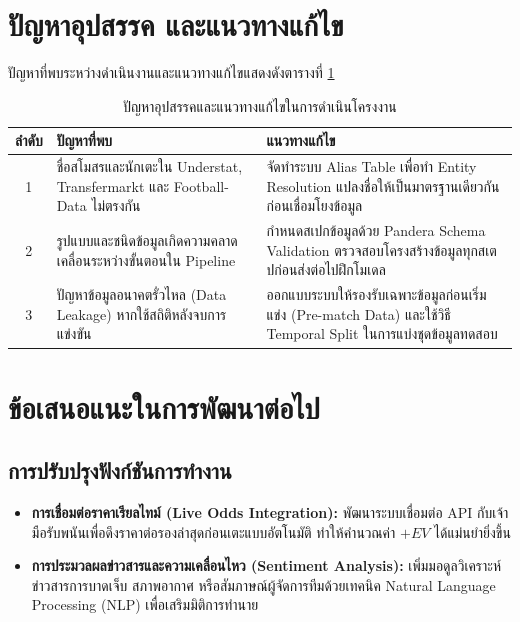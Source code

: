 \section{ปัญหาอุปสรรค และแนวทางแก้ไข}

ปัญหาที่พบระหว่างดำเนินงานและแนวทางแก้ไขแสดงดังตารางที่ \ref{tab:problems}

\begin{table}[htbp]
\centering
\caption{ปัญหาอุปสรรคและแนวทางแก้ไขในการดำเนินโครงงาน}
\label{tab:problems}
\begin{tabular}{|c|p{5cm}|p{6.5cm}|}
\hline
\textbf{ลำดับ} & \textbf{ปัญหาที่พบ} & \textbf{แนวทางแก้ไข} \\
\hline
1 & ชื่อสโมสรและนักเตะใน Understat, Transfermarkt และ Football-Data ไม่ตรงกัน & จัดทำระบบ Alias Table เพื่อทำ Entity Resolution แปลงชื่อให้เป็นมาตรฐานเดียวกันก่อนเชื่อมโยงข้อมูล \\ \hline
2 & รูปแบบและชนิดข้อมูลเกิดความคลาดเคลื่อนระหว่างขั้นตอนใน Pipeline & กำหนดสเปกข้อมูลด้วย Pandera Schema Validation ตรวจสอบโครงสร้างข้อมูลทุกสเตปก่อนส่งต่อไปฝึกโมเดล \\ \hline
3 & ปัญหาข้อมูลอนาคตรั่วไหล (Data Leakage) หากใช้สถิติหลังจบการแข่งขัน & ออกแบบระบบให้รองรับเฉพาะข้อมูลก่อนเริ่มแข่ง (Pre-match Data) และใช้วิธี Temporal Split ในการแบ่งชุดข้อมูลทดสอบ \\
\hline
\end{tabular}
\end{table}

\section{ข้อเสนอแนะในการพัฒนาต่อไป}

\subsection{การปรับปรุงฟังก์ชันการทำงาน}

\begin{itemize}
    \item \textbf{การเชื่อมต่อราคาเรียลไทม์ (Live Odds Integration):} พัฒนาระบบเชื่อมต่อ API กับเจ้ามือรับพนันเพื่อดึงราคาต่อรองล่าสุดก่อนเตะแบบอัตโนมัติ ทำให้คำนวณค่า $+EV$ ได้แม่นยำยิ่งขึ้น
    \item \textbf{การประมวลผลข่าวสารและความเคลื่อนไหว (Sentiment Analysis):} เพิ่มมอดูลวิเคราะห์ข่าวสารการบาดเจ็บ สภาพอากาศ หรือสัมภาษณ์ผู้จัดการทีมด้วยเทคนิค Natural Language Processing (NLP) เพื่อเสริมมิติการทำนาย
\end{itemize}

